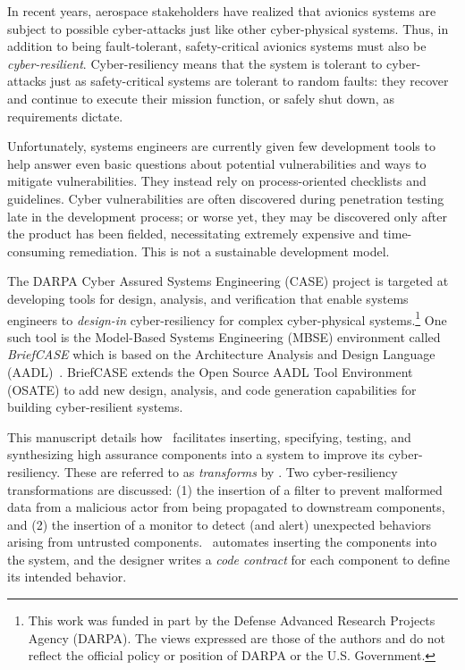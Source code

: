 
In recent years, aerospace stakeholders have realized that avionics systems are subject to possible cyber-attacks just like other cyber-physical systems.  
Thus, in addition to being fault-tolerant, safety-critical avionics systems must also be {\em cyber-resilient}.
Cyber-resiliency means that the system is tolerant to cyber-attacks just as safety-critical systems are tolerant to random faults: they recover and continue to execute their mission function, or safely shut down, as requirements dictate.

Unfortunately, systems engineers are currently given few development tools to help answer even basic questions about potential vulnerabilities and ways to mitigate vulnerabilities.
They instead rely on process-oriented checklists and guidelines.
Cyber vulnerabilities are often discovered during penetration testing late in the development process; or worse yet, they may be discovered only after the product has been fielded, necessitating extremely expensive and time-consuming remediation. This is not a sustainable development model.

The DARPA Cyber Assured Systems Engineering (CASE) project is targeted at developing tools for design, analysis, and verification that enable systems engineers to {\em design-in} cyber-resiliency for complex cyber-physical systems.\footnote{This work was funded in part by the Defense Advanced Research Projects Agency (DARPA).  The views expressed are those of the authors and do not reflect the official policy or position of DARPA or the U.S. Government.}
One such tool is the Model-Based Systems Engineering (MBSE) environment called {\em BriefCASE} which is based on the Architecture Analysis and Design Language (AADL)~\cite{aadl}.  BriefCASE extends the Open Source AADL Tool Environment (OSATE) to add new design, analysis, and code generation capabilities for building cyber-resilient systems.

This manuscript details how \brfcs\ facilitates inserting, specifying, testing, and synthesizing high assurance components into a system to improve its cyber-resiliency.
These are referred to as \emph{transforms} by \brfcs.
Two cyber-resiliency transformations are discussed: (1) the insertion
of a filter to prevent malformed data from a malicious actor from
being propagated to downstream components, and (2) the insertion of a
monitor to detect (and alert) unexpected behaviors arising from
untrusted components.
\brfcs\ automates inserting the components into the system, and the designer writes a \emph{code contract} for each component to define its intended behavior.

